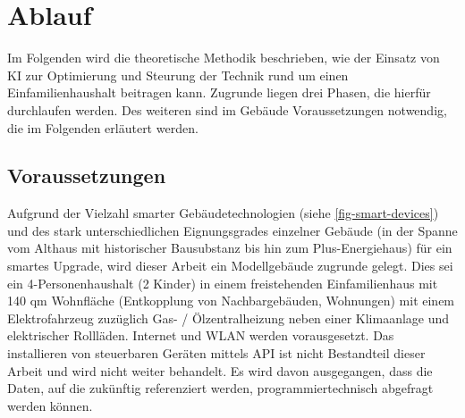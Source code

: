 \chapter{Ablauf}
Im Folgenden wird die theoretische Methodik beschrieben, wie der Einsatz von \gls{KI} zur Optimierung und Steurung der Technik rund um einen Einfamilienhaushalt beitragen kann. Zugrunde liegen drei Phasen, die hierfür durchlaufen werden. Des weiteren sind im Gebäude Voraussetzungen notwendig, die im Folgenden erläutert werden.

\section{Voraussetzungen}
Aufgrund der Vielzahl smarter Gebäudetechnologien (siehe \cref{fig-smart-devices}) und des stark unterschiedlichen Eignungsgrades einzelner Gebäude (in der Spanne vom Althaus mit historischer Bausubstanz bis hin zum Plus-Energiehaus) für ein smartes Upgrade, wird dieser Arbeit ein Modellgebäude zugrunde gelegt. Dies sei ein 4-Personenhaushalt (2 Kinder) in einem freistehenden Einfamilienhaus mit 140 qm Wohnfläche (Entkopplung von Nachbargebäuden, Wohnungen) mit einem Elektrofahrzeug zuzüglich Gas- / Ölzentralheizung neben einer Klimaanlage und elektrischer Rollläden. Internet und WLAN werden vorausgesetzt. Das installieren von steuerbaren Geräten mittels \gls{API} ist nicht Bestandteil dieser Arbeit und wird nicht weiter behandelt. Es wird davon ausgegangen, dass die Daten, auf die zukünftig referenziert werden, programmiertechnisch abgefragt werden können.


